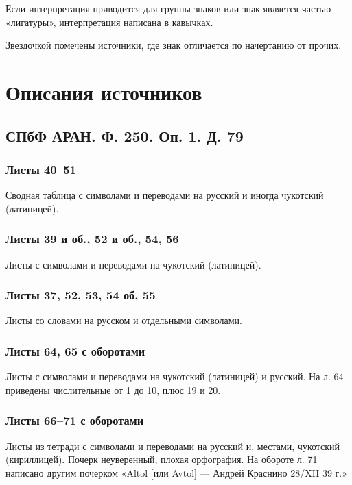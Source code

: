 \documentclass{article}
\begin{document}
Если интерпретация приводится для группы знаков или знак является частью «лигатуры», интерпретация написана в кавычках.

Звездочкой помечены источники, где знак отличается по начертанию от прочих.

\section{Описания источников} 

\subsection{СПбФ АРАН. Ф. 250. Оп. 1. Д. 79}

\subsubsection{Листы 40–51}

Сводная таблица с символами и переводами на русский и иногда чукотский (латиницей).

\subsubsection{Листы 39 и об., 52 и об., 54, 56}

Листы с символами и переводами на чукотский (латиницей).

\subsubsection{Листы 37, 52, 53, 54 об, 55}

Листы со словами на русском и отдельными символами.

\subsubsection{Листы 64, 65 с оборотами}

Листы с символами и переводами на чукотский (латиницей) и русский. На л. 64 приведены числительные от 1 до 10, плюс 19 и 20.

\subsubsection{Листы 66–71 с оборотами}

Листы из тетради с символами и переводами на русский и, местами, чукотский (кириллицей). Почерк неуверенный, плохая орфография. На обороте л. 71 написано другим почерком «Altol [или Avtol] — Андрей Краснино 28/XII 39 г.»
\end{document}
